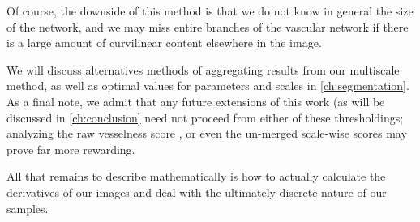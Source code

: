 Of course, the downside of this method is that we do not know in general the size of the network, and  we may miss entire branches of the vascular network if there is a large amount of curvilinear content elsewhere in the image.

We will discuss alternatives methods of aggregating results from our multiscale method, as well as optimal values for parameters and scales
in \cref{ch:segmentation}. As a final note, we admit that any future extensions of this work (as will be discussed in \cref{ch:conclusion} need not proceed from either of these thresholdings; analyzing the raw vesselness score \Vmax, or even the un-merged scale-wise scores may prove far more rewarding.


All that remains to describe mathematically is how to actually calculate the derivatives of our images and deal with the ultimately discrete nature of our samples.    